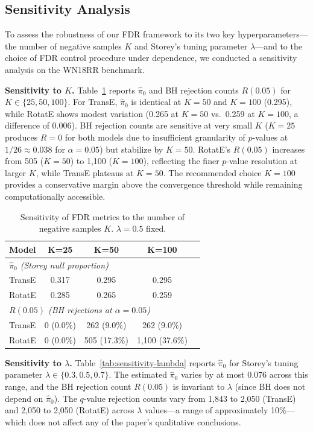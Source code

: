 \subsection{Sensitivity Analysis}
\label{subsec:sensitivity}

To assess the robustness of our FDR framework to its two key hyperparameters---the number of negative samples $K$ and Storey's tuning parameter $\lambda$---and to the choice of FDR control procedure under dependence, we conducted a sensitivity analysis on the WN18RR benchmark.

\textbf{Sensitivity to $K$.}
Table~\ref{tab:sensitivity-K} reports $\hat{\pi}_0$ and BH rejection counts $R(0.05)$ for $K \in \{25, 50, 100\}$.
For TransE, $\hat{\pi}_0$ is identical at $K=50$ and $K=100$ (0.295), while RotatE shows modest variation (0.265 at $K=50$ vs.\ 0.259 at $K=100$, a difference of 0.006). BH rejection counts are sensitive at very small $K$ ($K=25$ produces $R=0$ for both models due to insufficient granularity of $p$-values at $1/26 \approx 0.038$ for $\alpha = 0.05$) but stabilize by $K=50$. RotatE's $R(0.05)$ increases from 505 ($K=50$) to 1,100 ($K=100$), reflecting the finer $p$-value resolution at larger $K$, while TransE plateaus at $K=50$. The recommended choice $K=100$ provides a conservative margin above the convergence threshold while remaining computationally accessible.

\begin{table}[h]
\centering
\caption{Sensitivity of FDR metrics to the number of negative samples $K$. $\lambda = 0.5$ fixed.}
\label{tab:sensitivity-K}
\begin{tabular}{lcccc}
\toprule
\textbf{Model} & \textbf{K=25} & \textbf{K=50} & \textbf{K=100} \\
\midrule
\multicolumn{4}{l}{\textit{$\hat{\pi}_0$ (Storey null proportion)}} \\
\quad TransE & 0.317 & 0.295 & 0.295 \\
\quad RotatE & 0.285 & 0.265 & 0.259 \\
\midrule
\multicolumn{4}{l}{\textit{$R(0.05)$ (BH rejections at $\alpha=0.05$)}} \\
\quad TransE & 0 (0.0\%) & 262 (9.0\%) & 262 (9.0\%) \\
\quad RotatE & 0 (0.0\%) & 505 (17.3\%) & 1,100 (37.6\%) \\
\bottomrule
\end{tabular}
\end{table}

\textbf{Sensitivity to $\lambda$.}
Table~\ref{tab:sensitivity-lambda} reports $\hat{\pi}_0$ for Storey's tuning parameter $\lambda \in \{0.3, 0.5, 0.7\}$.
The estimated $\hat{\pi}_0$ varies by at most 0.076 across this range, and the BH rejection count $R(0.05)$ is invariant to $\lambda$ (since BH does not depend on $\hat{\pi}_0$).
The $q$-value rejection counts vary from 1,843 to 2,050 (TransE) and 2,050 to 2,050 (RotatE) across $\lambda$ values---a range of approximately 10\%---which does not affect any of the paper's qualitative conclusions.

